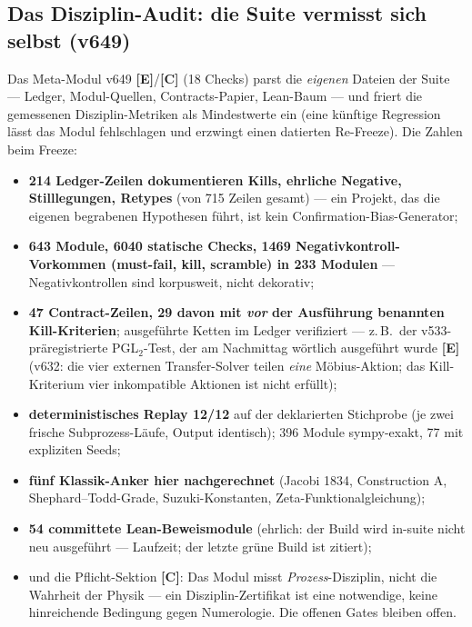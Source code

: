 \documentclass[11pt,a4paper]{article}
\newcommand{\E}{\textcolor{gut}{\textbf{[E]}}}
\newcommand{\C}{\textcolor{kern}{\textbf{[C]}}}
\begin{document}
\subsection*{Das Disziplin-Audit: die Suite vermisst sich selbst
(v649)}

Das Meta-Modul v649 \E{}/\C{} (18 Checks) parst die
\emph{eigenen} Dateien der Suite --- Ledger, Modul-Quellen,
Contracts-Papier, Lean-Baum --- und friert die gemessenen
Disziplin-Metriken als Mindestwerte ein (eine künftige Regression
lässt das Modul fehlschlagen und erzwingt einen datierten
Re-Freeze). Die Zahlen beim Freeze:

\begin{itemize}
\item \textbf{214 Ledger-Zeilen dokumentieren Kills, ehrliche
      Negative, Stilllegungen, Retypes} (von 715 Zeilen gesamt) ---
      ein Projekt, das die eigenen begrabenen Hypothesen führt, ist
      kein Confirmation-Bias-Generator;
\item \textbf{643 Module, 6040 statische Checks, 1469
      Negativkontroll-Vorkommen (must-fail, kill, scramble) in 233
      Modulen} --- Negativkontrollen sind korpusweit, nicht
      dekorativ;
\item \textbf{47 Contract-Zeilen, 29 davon mit \emph{vor} der
      Ausführung benannten Kill-Kriterien}; ausgeführte Ketten im
      Ledger verifiziert --- z.\,B.\ der v533-präregistrierte
      PGL$_2$-Test, der am Nachmittag wörtlich ausgeführt wurde
      \E{} (v632: die vier externen Transfer-Solver teilen
      \emph{eine} Möbius-Aktion; das Kill-Kriterium \glqq{}vier
      inkompatible Aktionen\grqq{} ist nicht erfüllt);
\item \textbf{deterministisches Replay 12/12} auf der deklarierten
      Stichprobe (je zwei frische Subprozess-Läufe, Output
      identisch); 396 Module sympy-exakt, 77 mit expliziten Seeds;
\item \textbf{fünf Klassik-Anker hier nachgerechnet} (Jacobi 1834,
      Construction A, Shephard--Todd-Grade, Suzuki-Konstanten,
      Zeta-Funktionalgleichung);
\item \textbf{54 committete Lean-Beweismodule} (ehrlich: der Build
      wird in-suite nicht neu ausgeführt --- Laufzeit; der letzte
      grüne Build ist zitiert);
\item und die Pflicht-Sektion \C{}: Das Modul misst
      \emph{Prozess}-Disziplin, nicht die Wahrheit der Physik ---
      ein Disziplin-Zertifikat ist eine notwendige, keine
      hinreichende Bedingung gegen Numerologie. Die offenen Gates
      bleiben offen.
\end{itemize}
\end{document}

